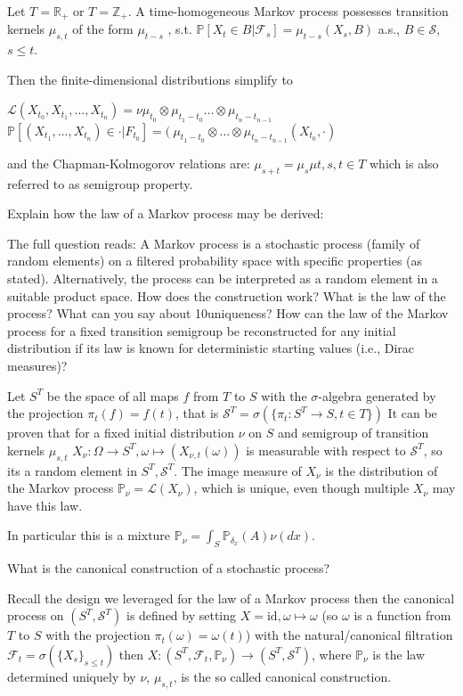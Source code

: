 Let \( T = \mathbb{R}_{+} \) or \( T = \mathbb{Z}_{+} \).
A time-homogeneous Markov process possesses transition kernels \( \mu_{s,t} \) of the form \( \mu_{t-s} \) , s.t.
\( \mathbb{P}[X_t \in B|\mathcal{F}_s] = \mu_{t-s}(X_s , B) \) a.s., \( B \in \mathcal{S}\), \( s \leq t \).

Then the finite-dimensional distributions simplify to 

\( \mathcal{L}(X_{t_0} , X_{t_1}, \dots, X_{t_n}) = \nu \mu_{t_0} \otimes \mu_{t_1 - t_0} \dots \otimes \mu_{t_n - t_{n-1}} \)
\( \mathbb{P}[(X_{t_1}, \dots, X_{t_n}) \in \cdot | F_{t_0}] = (\ \mu_{t_1 - t_0} \otimes \dots \otimes \mu_{t_n - t_{n-1}}(X_{t_0}, \cdot) \)

and the Chapman-Kolmogorov relations are:
\( \mu_{s+t} = \mu_{s}\mu{t}, s, t \in T \)
which is also referred to as semigroup property.


Explain how the law of a Markov process may be derived:

The full question reads:
A Markov process is a stochastic process (family of random elements) on a filtered
probability space with specific properties (as stated). Alternatively, the process
can be interpreted as a random element in a suitable product space. How does
the construction work? What is the law of the process? What can you say about
10uniqueness? How can the law of the Markov process for a fixed transition semigroup
be reconstructed for any initial distribution if its law is known for deterministic
starting values (i.e., Dirac measures)?

Let \( S^{T} \) be the space of all maps \( f \) from \( T \) to \( S \) with the \( \sigma \)-algebra
generated by the projection \( \pi_t(f) = f(t) \), that is \( \mathcal{S}^{T} = \sigma(\{\pi_t : S^{T} \to S, t \in T\}) \)
It can be proven that for a fixed initial distribution \( \nu \) on \( S \) and semigroup of transition kernels \( \mu_{s,t} \)
\( X_{\nu} : \Omega \to S^{T}, \omega \mapsto (X_{\nu,t}(\omega)) \)
is measurable with respect to \( \mathcal{S}^{T} \), so its a random element in \( S^{T}, \mathcal{S}^T \).
The image measure of \( X_\nu \) is the distribution of the Markov process \( \mathbb{P}_\nu = \mathcal{L}(X_\nu) \),
which is unique, even though multiple \( X_\nu \) may have this law.

In particular this is a mixture \( \mathbb{P}_\nu = \int_{S} \mathbb{P}_{\delta_x}(A)\nu(dx)\).

What is the canonical construction of a stochastic process?

Recall the design we leveraged for the law of a Markov process then
the canonical process on \( (S^T , \mathcal{S}^T) \)
is defined by setting \( X = \text{id}, \omega \mapsto \omega \)
(so \( \omega \) is a function from \( T \) to \( S \) with the projection 
\( \pi_t(\omega) = \omega(t) \)) 
with the natural/canonical filtration \( \mathcal{F}_t = \sigma(\{X_s\}_{s \leq t}) \) then
\( X : (S^{T}, \mathcal{F}_t, \mathbb{P}_\nu) \to (S^T, \mathcal{S}^T) \), where  
\( \mathbb{P}_\nu \) is the law determined uniquely by \( \nu \), \( \mu_{s,t} \),
is the so called canonical construction.


